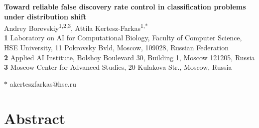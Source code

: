 \documentclass[10pt,letterpaper]{article}
\begin{document}
\vspace*{0.2in}

\begin{flushleft}
{\Large
\textbf{Toward reliable false discovery rate control in classification problems under distribution shift} %
}
\newline
\\
Andrey Borevskiy\textsuperscript{1,2,3},
Attila Kertesz-Farkas\textsuperscript{1,$\ast$}
\\
\bigskip
\textbf{1} Laboratory on AI for Computational Biology, Faculty of Computer Science, HSE University, 11 Pokrovsky Bvld, Moscow, 109028, Russian Federation
\\
\textbf{2} Applied AI Institute, Bolshoy Boulevard 30, Building 1, Moscow 121205, Russia
\\
\textbf{3} Moscow Center for Advanced Studies, 20 Kulakova Str., Moscow, Russia
\\
\bigskip

% 
%

$\ast$ akerteszfarkas@hse.ru

\end{flushleft}


%
\section*{Abstract}
\end{document}
